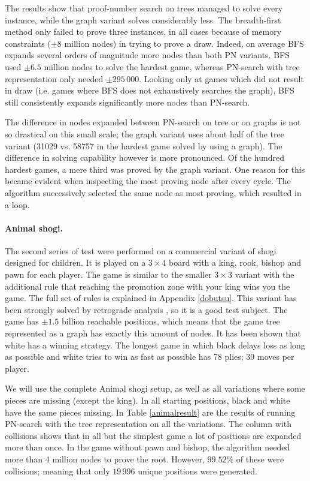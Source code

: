 \documentclass[a4paper, 11pt]{article}
\begin{document}
The results show that proof-number search on trees managed to solve every instance, while the graph variant solves considerably less. The
breadth-first method only failed to prove three instances, in all cases because of memory constraints ($\pm8$ million nodes) in trying to prove a draw.
Indeed, on average BFS expands several orders of magnitude more nodes than both PN variants. BFS used $\pm6.5$ million nodes to solve the hardest
game, whereas PN-search with tree representation only needed $\pm295\,000$. Looking only at games which did not result in draw (i.e. games where
BFS does not exhaustively searches the graph), BFS still consistently expands significantly more nodes than PN-search.

The difference in nodes expanded between PN-search on tree or on graphs is not so drastical
on this small scale; the graph variant uses about half of the tree variant (31029 vs. 58757 in the hardest game solved by using a graph).
The difference in solving capability however is more pronounced. Of the hundred hardest games, a mere third was proved by the graph variant.
One reason for this became evident when inspecting the most proving node after every cycle. The algorithm successively selected the same
node as most proving, which resulted in a loop.

\paragraph{Animal shogi.} The second series of test were performed on a commercial variant of shogi designed for children. It is played on a $3 \times 4$
board with a king, rook, bishop and pawn for each player.
The game is similar to the smaller $3 \times 3$ variant with the additional rule that reaching the promotion zone with your king wins you the game.
The full set of rules is explained in Appendix \ref{dobutsu}. This variant has been strongly solved by retrograde analysis
\cite{tetsuroanimal}, so it is a good test subject. The game has $\pm1.5$ billion reachable positions, which means that the game tree represented as a graph has exactly
this amount of nodes. It has been shown that white has a winning strategy. The longest game in which black
delays loss as long as possible and white tries to win as fast as possible has 78 plies; 39 moves per player. 

We will use the complete Animal shogi setup, as well as all variations where some pieces are missing (except the king). In all starting positions, black and white have the
same pieces missing. In Table \ref{animalresult} are the results of running PN-search with the tree representation on all the variations. The column with collisions shows that
in all but the simplest game a lot of positions are expanded more than once. In the game without pawn and bishop, the algorithm needed more than $4$ million
nodes to prove the root. However, $99.52\%$ of these were collisions; meaning that only $19\,996$ unique positions were generated.
\end{document}
